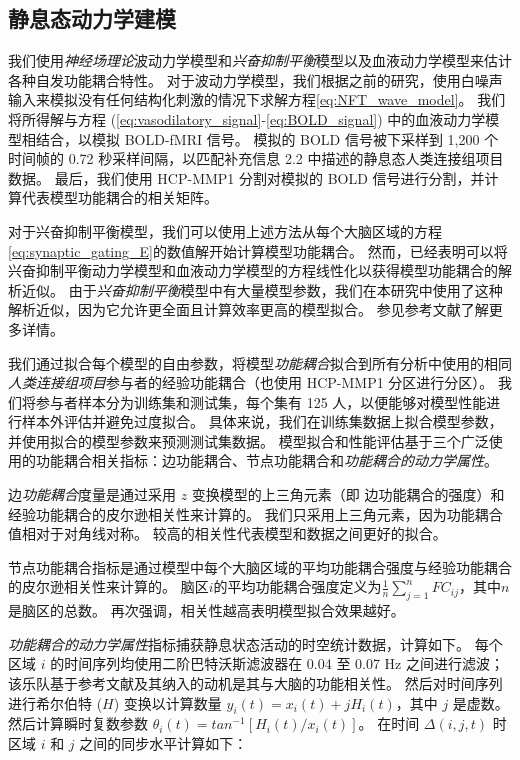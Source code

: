 \documentclass[lang=cn,a4paper,newtx,citestyle=gb7714-2015, bibstyle=gb7714-2015]{elegantpaper}
\begin{document}
\subsection{静息态动力学建模} \label{sec:modelling_resting}

我们使用\textit{神经场理论}波动力学模型和\textit{兴奋抑制平衡}模型以及血液动力学模型来估计各种自发功能耦合特性。
对于波动力学模型，我们根据之前的研究\cite{robinson2005multiscale,sanz2018nftsim}，使用白噪声输入来模拟没有任何结构化刺激的情况下求解方程\ref{eq:NFT_wave_model}。
我们将所得解与方程 (\ref{eq:vasodilatory_signal}-\ref{eq:BOLD_signal}) 中的血液动力学模型相结合，以模拟 BOLD-fMRI 信号。
模拟的 BOLD 信号被下采样到 1,200 个时间帧的 0.72 秒采样间隔，以匹配补充信息 2.2 中描述的静息态人类连接组项目数据。
最后，我们使用 HCP-MMP1 分割对模拟的 BOLD 信号进行分割，并计算代表模型功能耦合的相关矩阵。


对于兴奋抑制平衡模型，我们可以使用上述方法从每个大脑区域的方程\ref{eq:synaptic_gating_E}的数值解开始计算模型功能耦合。
然而，已经表明可以将兴奋抑制平衡动力学模型和血液动力学模型的方程线性化以获得模型功能耦合\cite{demirtacs2019hierarchical}的解析近似。
由于\textit{兴奋抑制平衡}模型中有大量模型参数，我们在本研究中使用了这种解析近似，因为它允许更全面且计算效率更高的模型拟合。
参见参考文献\cite{demirtacs2019hierarchical}了解更多详情。


我们通过拟合每个模型的自由参数，将模型\textit{功能耦合}拟合到所有分析中使用的相同\textit{人类连接组项目}参与者的经验功能耦合（也使用 HCP-MMP1 分区进行分区）。
我们将参与者样本分为训练集和测试集，每个集有 125 人，以便能够对模型性能进行样本外评估并避免过度拟合。
具体来说，我们在训练集数据上拟合模型参数，并使用拟合的模型参数来预测测试集数据。
模型拟合和性能评估基于三个广泛使用的功能耦合相关指标\cite{deco2021dynamical,aquino2022intersection}：边功能耦合、节点功能耦合和\textit{功能耦合的动力学属性}。


边\textit{功能耦合}度量是通过采用 $ z $ 变换模型的上三角元素（即 边功能耦合的强度）和经验功能耦合的皮尔逊相关性来计算的。
我们只采用上三角元素，因为功能耦合值相对于对角线对称。
较高的相关性代表模型和数据之间更好的拟合。


节点功能耦合指标是通过模型中每个大脑区域的平均功能耦合强度与经验功能耦合的皮尔逊相关性来计算的。
脑区$ i $的平均功能耦合强度定义为$ \frac{1}{n} \sum_{j=1}^{n} FC_{ij} $，其中$ n $是脑区的总数。
再次强调，相关性越高表明模型拟合效果越好。


\textit{功能耦合的动力学属性}指标捕获静息状态活动的时空统计数据，计算如下\cite{aquino2022intersection}。
每个区域 $ i $ 的时间序列均使用二阶巴特沃斯滤波器在 0.04 至 0.07 Hz 之间进行滤波；
该乐队基于参考文献\cite{deco2017dynamics}及其纳入的动机是其与大脑的功能相关性\cite{glerean2012functional,pang2019power}。
然后对时间序列进行希尔伯特 ($ H $) 变换以计算数量 $ y_i(t) = x_i(t) + jH_i (t) $，其中 $ j $ 是虚数。
然后计算瞬时复数参数 $ \theta_i(t) = tan^{-1} [H_i(t) / x_i(t)] $。
在时间 $ \Delta(i,j,t) $ 时区域 $ i $ 和 $ j $ 之间的同步水平计算如下：
\end{document}
